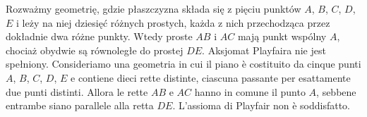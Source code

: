 \begin{example}
    Rozważmy geometrię, gdzie płaszczyzna składa się z pięciu punktów $A$, $B$, $C$, $D$, $E$ i leży na niej dziesięć różnych prostych, każda z nich przechodząca przez dokładnie dwa różne punkty. %
    Wtedy proste $AB$ i $AC$ mają punkt wspólny $A$, chociaż obydwie są równoległe do prostej $DE$. %
    Aksjomat Playfaira nie jest spełniony. %
    Consideriamo una geometria in cui il piano è costituito da cinque punti $A$, $B$, $C$, $D$, $E$ e contiene dieci rette distinte, ciascuna passante per esattamente due punti distinti. %
    Allora le rette $AB$ e $AC$ hanno in comune il punto $A$, sebbene entrambe siano parallele alla retta $DE$. %
    L'assioma di Playfair non è soddisfatto. %
\end{example}

